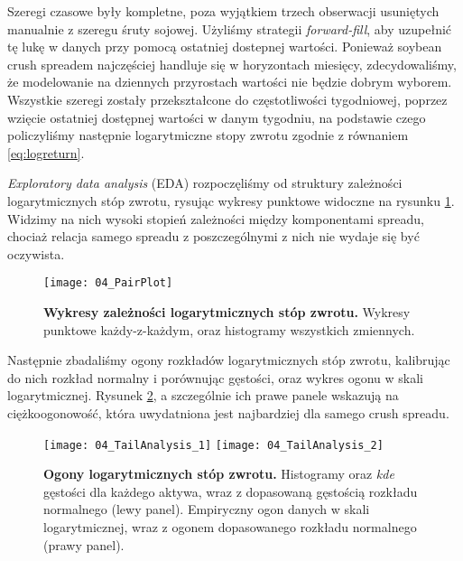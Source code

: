Szeregi czasowe były kompletne, poza wyjątkiem trzech obserwacji usuniętych manualnie z szeregu śruty sojowej. Użyliśmy strategii \emph{forward-fill}, aby uzupełnić tę lukę w danych przy pomocą ostatniej dostepnej wartości. Ponieważ soybean crush spreadem najczęściej handluje się w horyzontach miesięcy, zdecydowaliśmy, że modelowanie na dziennych przyrostach wartości nie będzie dobrym wyborem. Wszystkie szeregi zostały przekształcone do częstotliwości tygodniowej, poprzez wzięcie ostatniej dostępnej wartości w danym tygodniu, na podstawie czego policzyliśmy następnie logarytmiczne stopy zwrotu zgodnie z równaniem \ref{eq:logreturn}.

\emph{Exploratory data analysis} (EDA) rozpoczęliśmy od struktury zależności logarytmicznych stóp zwrotu, rysując wykresy punktowe widoczne na rysunku \ref{fig:pairplot_original_scale}. Widzimy na nich wysoki stopień zależności między komponentami spreadu, chociaż relacja samego spreadu z poszczególnymi z nich nie wydaje się być oczywista.

\begin{figure}[h]
	\centering
	\texttt{[image: 04\_PairPlot]}
	\caption{\textbf{Wykresy zależności logarytmicznych stóp zwrotu.} Wykresy punktowe każdy-z-każdym, oraz histogramy wszystkich zmiennych. \label{fig:pairplot_original_scale}}
\end{figure}

Następnie zbadaliśmy ogony rozkładów logarytmicznych stóp zwrotu, kalibrując do nich rozkład normalny i porównując gęstości, oraz wykres ogonu w skali logarytmicznej. Rysunek \ref{fig:tail_analysis}, a szczególnie ich prawe panele wskazują na ciężkoogonowość, która uwydatniona jest najbardziej dla samego crush spreadu.\\

\begin{figure}[h]
	\centering
	\texttt{[image: 04\_TailAnalysis\_1]}
	\texttt{[image: 04\_TailAnalysis\_2]}
	
	\caption{\textbf{Ogony logarytmicznych stóp zwrotu.} Histogramy oraz \emph{kde} gęstości dla każdego aktywa, wraz z dopasowaną gęstością rozkładu normalnego (lewy panel). Empiryczny ogon danych w skali logarytmicznej, wraz z ogonem dopasowanego rozkładu normalnego (prawy panel). \label{fig:tail_analysis}}
\end{figure}

\FloatBarrier